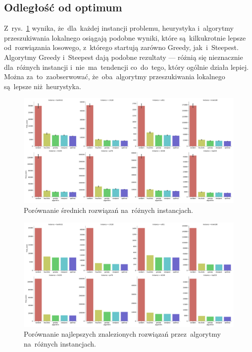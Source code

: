 \subsection{Odległość od optimum}

Z~rys.~\ref{fig:avg} wynika, że~dla~każdej instancji problemu, heurystyka i~algorytmy przeszukiwania lokalnego osiągają podobne wyniki, które są~kilkukrotnie lepsze od~rozwiązania losowego, z~którego startują zarówno Greedy, jak~i~Steepest. Algorytmy Greedy i~Steepest dają podobne rezultaty --- różnią się nieznacznie dla~różnych instancji i~nie~ma~tendencji co~do~tego, który ogólnie działa lepiej. Można za~to~zaobserwować, że~oba~algorytmy przeszukiwania lokalnego są~lepsze niż~heurystyka.

\begin{figure}
\begin{center}
\includegraphics[width=1.0\textwidth]{graphs/score_comparison_bar_avg.pdf}
\end{center}
\caption{Porównanie średnich rozwiązań na~różnych instancjach.}
\label{fig:avg}
\end{figure}

\begin{figure}
\begin{center}
\includegraphics[width=1.0\textwidth]{graphs/score_comparison_bar_min.pdf}
\end{center}
\caption{Porównanie najlepszych znalezionych rozwiązań przez~algorytmy na~różnych instancjach.}
\label{fig:best}
\end{figure}

